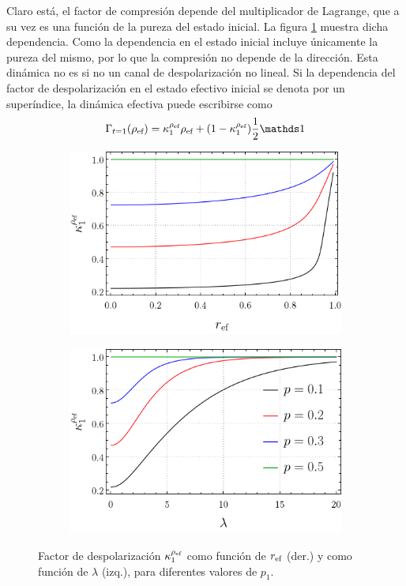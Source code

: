 Claro está, el factor de compresión depende del multiplicador de Lagrange, que a su vez es una función de la pureza del estado inicial. La figura \ref{fig:SWAPFactor2Drl} muestra dicha dependencia. Como la dependencia en el estado inicial incluye únicamente la pureza del mismo, por lo que la compresión no depende de la dirección. Esta dinámica no es si no un canal de despolarización no lineal. Si la dependencia del factor de despolarización en el estado efectivo inicial se denota por un superíndice, la dinámica efectiva puede escribirse como
\begin{equation}\label{eq:EffectiveSWAP1}
  \Gamma_{t=1}(\rho_{\ef})=\kappa_{1}^{\rho_{\ef}}\rho_{\ef}+(1-\kappa_{1}^{\rho_{\ef}})\frac{1}{2}\Id
\end{equation}
\begin{figure}[ht!]
  \centering
  \begin{subfigure}{0.5\textwidth}
    \centering
    \includegraphics[width=0.9\linewidth]{chapter3/figures_toy/K(r).png}
  \end{subfigure}%
  \begin{subfigure}{0.5\textwidth}
    \centering
    \includegraphics[width=0.9\linewidth]{chapter3/figures_toy/K(lambda).png}
  \end{subfigure}
  \caption{Factor de despolarización $\kappa_{1}^{\rho_{\text{ef}}}$ como función de $r_{\text{ef}}$ (der.) y como función de $\lambda$ (izq.), para diferentes valores de $p_{1}$.}\label{fig:SWAPFactor2Drl}
\end{figure}


